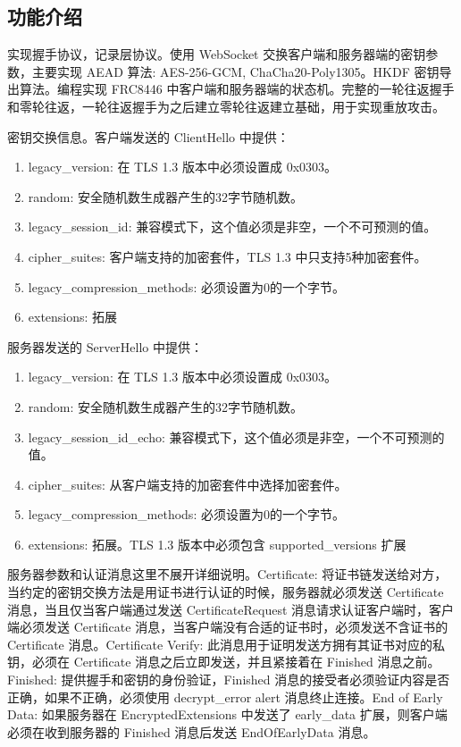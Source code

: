   \subsection{功能介绍}

  实现握手协议，记录层协议。使用 WebSocket 交换客户端和服务器端的密钥参数，主要实现 AEAD 算法: AES-256-GCM, ChaCha20-Poly1305。HKDF\cite{RFC5869} 密钥导出算法。编程实现 FRC8446 中客户端和服务器端的状态机。完整的一轮往返握手和零轮往返，一轮往返握手为之后建立零轮往返建立基础，用于实现重放攻击。

  密钥交换信息。客户端发送的 ClientHello 中提供：

  \begin{enumerate}
    \item legacy\_version: 在 TLS 1.3 版本中必须设置成 0x0303。
    \item random: 安全随机数生成器产生的32字节随机数。
    \item legacy\_session\_id: 兼容模式下，这个值必须是非空，一个不可预测的值。
    \item cipher\_suites: 客户端支持的加密套件，TLS 1.3 中只支持5种加密套件。
    \item legacy\_compression\_methods: 必须设置为0的一个字节。
    \item extensions: 拓展
  \end{enumerate}

  服务器发送的 ServerHello 中提供：

  \begin{enumerate}
    \item legacy\_version: 在 TLS 1.3 版本中必须设置成 0x0303。
    \item random: 安全随机数生成器产生的32字节随机数。
    \item legacy\_session\_id\_echo: 兼容模式下，这个值必须是非空，一个不可预测的值。
    \item cipher\_suites: 从客户端支持的加密套件中选择加密套件。
    \item legacy\_compression\_methods: 必须设置为0的一个字节。
    \item extensions: 拓展。TLS 1.3 版本中必须包含 supported\_versions 扩展
  \end{enumerate}

  服务器参数和认证消息这里不展开详细说明。Certificate: 将证书链发送给对方，当约定的密钥交换方法是用证书进行认证的时候，服务器就必须发送 Certificate 消息，当且仅当客户端通过发送 CertificateRequest 消息请求认证客户端时，客户端必须发送 Certificate 消息，当客户端没有合适的证书时，必须发送不含证书的 Certificate 消息。Certificate Verify: 此消息用于证明发送方拥有其证书对应的私钥，必须在 Certificate 消息之后立即发送，并且紧接着在 Finished 消息之前。Finished: 提供握手和密钥的身份验证，Finished 消息的接受者必须验证内容是否正确，如果不正确，必须使用 decrypt\_error alert 消息终止连接。End of Early Data: 如果服务器在 EncryptedExtensions 中发送了 early\_data 扩展，则客户端必须在收到服务器的 Finished 消息后发送 EndOfEarlyData 消息。
